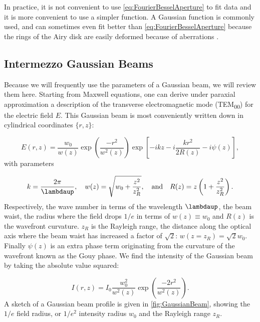 In practice, it is not convenient to use \cref{eq:FourierBesselAperture} to fit data and it is more convenient to use a simpler function. 
A Gaussian function is commonly used, and can sometimes even fit better than \cref{eq:FourierBesselAperture} because the rings of the Airy disk are easily deformed because of aberrations \cite{Knottnerus2018}. 

\mbox{}\par
\begin{mdframed}
    \subsection*{Intermezzo Gaussian Beams}\label{sec:GaussianBeams}
    
    Because we will frequently use the parameters of a Gaussian beam, we will review them here. 
    Starting from Maxwell equations, one can derive under paraxial approximation a description of the transverse electromagnetic mode (TEM\textsubscript{00}) \cite{Leeuwen2017} for the electric field $E$.
    This Gaussian beam is most conveniently written down in cylindrical coordinates $\{r,z\}$:
    
    \begin{equation}\label{eq:GaussianBeam}
    	E(r,z) = \frac{w_0}{w(z)} \exp{\left(\frac{-r^2}{w^2(z)}\right)} \exp{\left[-ikz-i\frac{kr^2}{2R(z)} - i\psi(z)\right]},
    \end{equation}
    with parameters
    
    \begin{equation}\label{eq:GaussianBeamParameters}
    	k = \frac{2\pi}{\lambdaup}, \quad 
    	w(z) = \sqrt{w_0 + \frac{z^2}{z_R^2}}, \quad \text{and} \quad
    	R(z) = z \left(1 + \frac{z^2}{z_R^2}\right).
    \end{equation}
    Respectively, the wave number in terms of the wavelength $\lambdaup$, the beam waist, the radius where the field drops $1/e$ in terms of $w(z)\equiv w_0$ and $R(z)$ is the wavefront curvature. $z_R$ is the Rayleigh range, the distance along the optical axis where the beam waist has increased a factor of $\sqrt{2}$: $w(z=z_R) = \sqrt{2}w_0$.
    Finally $\psi(z)$ is an extra phase term originating from the curvature of the wavefront known as the Gouy phase.
    We find the intensity of the Gaussian beam by taking the absolute value squared:
    
    \begin{equation}\label{eq:GaussianBeamIntensity}
    	I(r,z) = I_0 \frac{w_0^2}{w^2(z)} \exp{\left(\frac{-2r^2}{w^2(z)}\right)}.
    \end{equation}
    A sketch of a Gaussian beam profile is given in \cref{fig:GaussianBeam}, showing the $1/e$ field radius, or $1/e^2$ intensity radius $w_0$ and the Rayleigh range $z_R$. 
    

\end{mdframed}
